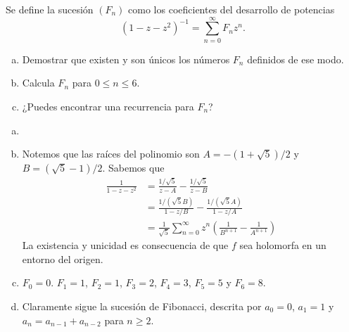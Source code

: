 \documentclass[twoside]{article}
\begin{document}
\newpage
\begin{ejercicio}{2}
Se define la sucesión $(F_n)$ como los coeficientes del desarrollo de potencias 
\[(1-z-z^2)^{-1}=\sum_{n=0}^\infty F_n z^n.\]
\begin{enumerate}[a)]
\item Demostrar que existen y son únicos los números $F_n$ definidos de ese modo.
\item Calcula $F_n$ para $0\le n\le 6$. 
\item ¿Puedes encontrar una recurrencia para $F_n$?
\end{enumerate}
\end{ejercicio}
\begin{solucion}
\begin{enumerate}[a)]
\item[]
\item Notemos que las raíces del polinomio son $A= -(1+\sqrt{5})/2$ y $B=(\sqrt{5}-1)/2$. Sabemos que
\begin{align*}
\frac{1}{1-z-z^2} &= \frac{1/\sqrt{5}}{z-A}-\frac{1/\sqrt{5}}{z-B}\\
&= \frac{1/(\sqrt{5}B)}{1-z/B} - \frac{1/(\sqrt{5}A)}{1-z/A}\\
& = 
\frac{1}{\sqrt{5}}\sum_{n=0}^\infty z^n\left(\frac{1}{B^{n+1}}-\frac{1}{A^{n+1}}\right)
\end{align*}
La existencia y unicidad es consecuencia de que $f$ sea holomorfa en un entorno del origen.
\item $F_0 = 0$. $F_1 = 1$, $F_2 = 1$, $F_3 = 2$, $F_4=3$, $F_5=5$ y $F_6 = 8$.
\item Claramente sigue la sucesión de Fibonacci, descrita por $a_0 =0$, $a_1=1$ y $a_n = a_{n-1}+a_{n-2}$ para $n\geq 2$.
\end{enumerate}
\end{solucion}
\end{document}
